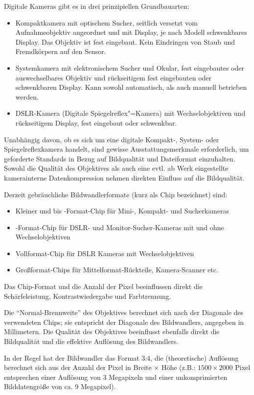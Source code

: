 Digitale Kameras gibt es in drei prinzipiellen Grundbauarten:
\begin{itemize}
	\item Kompaktkamera mit optischem Sucher, seitlich versetzt vom Aufnahmeobjektiv angeordnet und mit Display, je nach Modell schwenkbares Display. Das Objektiv ist fest eingebaut. Kein Eindringen von Staub und Fremdkörpern auf den Sensor. 
	\item Systemkamera mit elektronischem Sucher und Okular, fest eingebautes oder auswechselbares Objektiv und rückseitigem fest eingebauten oder schwenkbaren Display. Kann sowohl automatisch, als auch manuell betrieben werden.
	\item DSLR-Kamera (Digitale Spiegelreflex"=Kamera) mit Wechselobjektiven und rückseitigem Display, fest eingebaut oder schwenkbar.
\end{itemize}

Unabhängig davon, ob es sich um eine digitale Kompakt-, System- oder Spiegelreflexkamera handelt, sind gewisse Ausstattungsmerkmale erforderlich, um geforderte Standards in Bezug auf Bildqualität und Dateiformat einzuhalten. Sowohl die Qualität des Objektives als auch eine evtl. ab Werk eingestellte kamerainterne Datenkompression nehmen direkten Einfluss auf die Bildqualität.

Derzeit gebräuchliche Bildwandlerformate (kurz als Chip bezeichnet) sind:
\begin{itemize}
	\item Kleiner und bis \textonequarter-Format-Chip für Mini-, Kompakt- und Sucherkameras
	\item \textonehalf-Format-Chip für DSLR- und Monitor-Sucher-Kameras mit und ohne Wechselobjektiven
	\item Vollformat-Chip für DSLR Kameras mit Wechselobjektiven
	\item Großformat-Chips für Mittelformat-Rückteile, Kamera-Scanner etc.
\end{itemize}

Das Chip-Format und die Anzahl der Pixel beeinflussen direkt die Schärfeleistung, Kontrastwiedergabe und Farbtrennung.

Die "`Normal-Brennweite"' des Objektives berechnet sich nach der Diagonale des verwendeten Chips; sie entspricht der Diagonale des Bildwandlers, angegeben in Millimetern. Die Qualität des Objektives beeinflusst ebenfalls direkt die Bildqualität und die effektive Auflösung des Bildwandlers.

In der Regel hat der Bildwandler das Format 3:4, die (theoretische) Auflösung berechnet sich aus der Anzahl der Pixel in Breite $\times$ Höhe (z.B.: $1500\times 2000$ Pixel entsprechen einer Auflösung von 3 Megapixeln und einer unkomprimierten Bilddatengröße von ca. 9 Megapixel).

